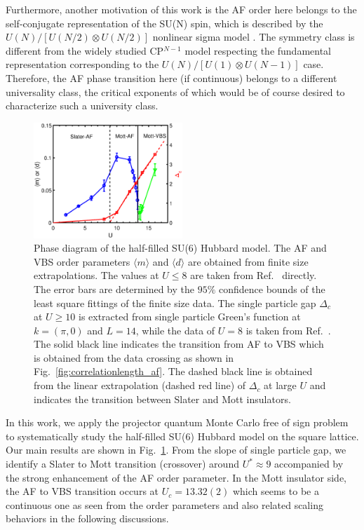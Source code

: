 \documentclass[twocolumn,superscriptaddress]{revtex4-1}
\begin{document}
Furthermore, another motivation of this work is the AF order here belongs to the self-conjugate representation of the SU(N) spin, which is described by the $U(N)/[U(N/2)\otimes U(N/2)]$ nonlinear sigma model \cite{MacFarlane1979,Duerksen1981,Read1989b,*Read1989a,*Read1990}. The symmetry class is different from the widely studied CP$^{N-1}$ model respecting the fundamental representation corresponding to the $U(N)/[U(1)\otimes U(N-1)]$ case. Therefore, the AF phase transition here (if continuous) belongs to a different universality class, the critical exponents of which would be of course desired to characterize such a university class.

\begin{figure} [h]
    \includegraphics[width=0.5\textwidth]{phasediagram}
    \caption{\label{fig:phasediagram}Phase diagram of the half-filled SU(6) Hubbard model. The AF and VBS order parameters $\langle m \rangle$ and $\langle d \rangle$ are obtained from finite size extrapolations. The values at $U\le8$ are taken from Ref.~ directly. The error bars are determined by the $95\%$ confidence bounds of the least square fittings of the finite size data. The single particle gap $\Delta_c$ at $U\ge10$ is extracted from single particle Green's function at $k=(\pi,0)$ and $L=14$, while the data of $U=8$ is taken from Ref.~. The solid black line indicates the transition from AF to VBS which is obtained from the data crossing as shown in Fig.~\ref{fig:correlationlength_af}. The dashed black line is obtained from the linear extrapolation (dashed red line) of $\Delta_c$ at large $U$ and indicates the transition between Slater and Mott insulators.}
\end{figure}

In this work, we apply the projector quantum Monte Carlo free of sign problem to systematically study the half-filled SU(6) Hubbard model on the square lattice. Our main results are shown in Fig.~\ref{fig:phasediagram}. From the slope of single particle gap, we identify a Slater to Mott transition (crossover) around $U^*\approx9$ accompanied by the strong enhancement of the AF order parameter. In the Mott insulator side, the AF to VBS transition occurs at $U_c=13.32(2)$ which seems to be a continuous one as seen from the order parameters and also related scaling behaviors in the following discussions. 
\end{document}
